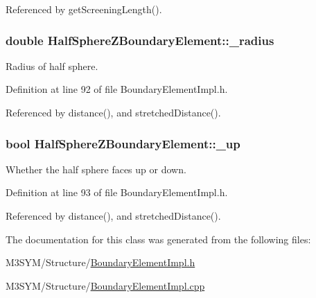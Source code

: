 Referenced by get\+Screening\+Length().

\hypertarget{classHalfSphereZBoundaryElement_ad1fff310ac2c3f221a8ab7393dc23b69}{
\subsubsection[{\+\_\+radius}]{\setlength{\rightskip}{0pt plus 5cm}double Half\+Sphere\+Z\+Boundary\+Element\+::\+\_\+radius\hspace{0.3cm}{\ttfamily [private]}}}\label{classHalfSphereZBoundaryElement_ad1fff310ac2c3f221a8ab7393dc23b69}


Radius of half sphere. 



Definition at line 92 of file Boundary\+Element\+Impl.\+h.



Referenced by distance(), and stretched\+Distance().

\hypertarget{classHalfSphereZBoundaryElement_a3251d9e34c161076f9324dc3f2477720}{
\subsubsection[{\+\_\+up}]{\setlength{\rightskip}{0pt plus 5cm}bool Half\+Sphere\+Z\+Boundary\+Element\+::\+\_\+up\hspace{0.3cm}{\ttfamily [private]}}}\label{classHalfSphereZBoundaryElement_a3251d9e34c161076f9324dc3f2477720}


Whether the half sphere faces up or down. 



Definition at line 93 of file Boundary\+Element\+Impl.\+h.



Referenced by distance(), and stretched\+Distance().



The documentation for this class was generated from the following files\+:\begin{DoxyCompactItemize}
\item 
M3\+S\+Y\+M/\+Structure/\hyperlink{BoundaryElementImpl_8h}{Boundary\+Element\+Impl.\+h}\item 
M3\+S\+Y\+M/\+Structure/\hyperlink{BoundaryElementImpl_8cpp}{Boundary\+Element\+Impl.\+cpp}\end{DoxyCompactItemize}
